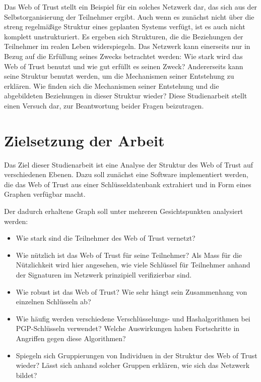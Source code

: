 Das Web of Trust stellt ein Beispiel für ein solches Netzwerk dar,
das sich aus der Selbstorganisierung der Teilnehmer ergibt. Auch wenn
es zunächst nicht über die streng regelmäßige Struktur eines
geplanten Systems verfügt, ist es auch nicht komplett
unstrukturiert. Es ergeben sich Strukturen, die die Beziehungen der
Teilnehmer im realen Leben widerspiegeln. Das Netzwerk kann
einerseits nur in Bezug auf die Erfüllung seines Zwecks betrachtet
werden: Wie stark wird das Web of Trust benutzt und wie gut erfüllt
es seinen Zweck? Andererseits kann seine Struktur benutzt werden, um
die Mechanismen seiner Entstehung zu erklären. Wie finden sich die
Mechanismen seiner Entstehung und die abgebildeten Beziehungen in
dieser Struktur wieder? Diese Studienarbeit stellt einen Versuch dar,
zur Beantwortung beider Fragen beizutragen.


\section{Zielsetzung der Arbeit}
\label{ch:Einleitung:sec:Zielsetzung}

Das Ziel dieser Studienarbeit ist eine Analyse der Struktur des Web of
Trust auf verschiedenen Ebenen. Dazu soll zunächst eine Software
implementiert werden, die das Web of Trust aus einer
Schlüsseldatenbank extrahiert und in Form eines Graphen verfügbar
macht. 

Der dadurch erhaltene Graph soll unter mehreren Gesichtspunkten
analysiert werden:

\begin{itemize}

\item Wie stark sind die Teilnehmer des Web of Trust vernetzt?

\item  Wie nützlich ist das Web of Trust für seine Teilnehmer? Als
  Mass für die Nützlichkeit wird hier angesehen, wie viele
  Schlüssel für Teilnehmer anhand der Signaturen im Netzwerk
  prinzipiell verifizierbar sind.

\item Wie robust ist das Web of Trust? Wie sehr hängt sein
  Zusammenhang von einzelnen Schlüsseln ab?

\item Wie häufig werden verschiedene Verschlüsselungs- und
  Hashalgorithmen bei PGP-Schlüsseln verwendet? Welche Auswirkungen
  haben Fortschritte in Angriffen gegen diese Algorithmen?

\item Spiegeln sich Gruppierungen von Individuen in der Struktur des
  Web of Trust wieder? Lässt sich anhand solcher Gruppen erklären,
  wie sich das Netzwerk bildet?
\end{itemize}

